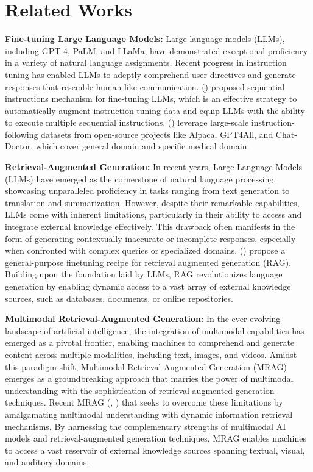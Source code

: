 \section{Related Works}



\textbf{Fine-tuning Large Language Models:} Large language models (LLMs), including GPT-4, PaLM, and LLaMa, have demonstrated exceptional proficiency in a variety of natural language assignments. Recent progress in instruction tuning has enabled LLMs to adeptly comprehend user directives and generate responses that resemble human-like communication. (\cite{hu2024finetuning}) proposed sequential instructions mechanism for fine-tuning LLMs, which is an effective strategy to automatically augment instruction tuning data and equip LLMs with the ability to execute multiple sequential instructions. (\cite{doan2023efficient}) leverage large-scale instruction-following datasets from open-source projects like Alpaca, GPT4All, and Chat-Doctor, which cover general domain and specific medical domain.

\textbf{Retrieval-Augmented Generation:} In recent years, Large Language Models (LLMs) have emerged as the cornerstone of natural language processing, showcasing unparalleled proficiency in tasks ranging from text generation to translation and summarization. However, despite their remarkable capabilities, LLMs come with inherent limitations, particularly in their ability to access and integrate external knowledge effectively. This drawback often manifests in the form of generating contextually inaccurate or incomplete responses, especially when confronted with complex queries or specialized domains. (\cite{lewis2020retrieval}) propose a general-purpose finetuning recipe for retrieval augmented generation (RAG). Building upon the foundation laid by LLMs, RAG revolutionizes language generation by enabling dynamic access to a vast array of external knowledge sources, such as databases, documents, or online repositories.

\textbf{Multimodal Retrieval-Augmented Generation:} In the ever-evolving landscape of artificial intelligence, the integration of multimodal capabilities has emerged as a pivotal frontier, enabling machines to comprehend and generate content across multiple modalities, including text, images, and videos. Amidst this paradigm shift, Multimodal Retrieval Augmented Generation (MRAG) emerges as a groundbreaking approach that marries the power of multimodal understanding with the sophistication of retrieval-augmented generation techniques.
Recent MRAG (\cite{chen2022murag}, \cite{yasunaga2022retrieval}) that seeks to overcome these limitations by amalgamating multimodal understanding with dynamic information retrieval mechanisms. By harnessing the complementary strengths of multimodal AI models and retrieval-augmented generation techniques, MRAG enables machines to access a vast reservoir of external knowledge sources spanning textual, visual, and auditory domains.

